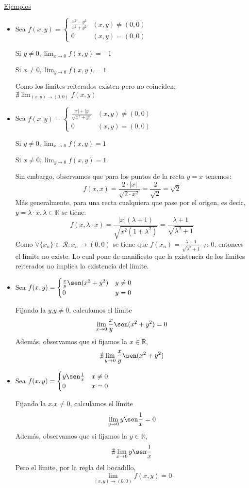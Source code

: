 \documentclass[10pt,a4paper,openright]{book}
\theoremstyle{break}
\begin{document}
\underline{Ejemplos}
\begin{itemize}
\item Sea $f(x,y) = \begin{cases} \frac{x^2 - y^2}{x^2 + y^2} & (x,y) \neq (0,0) \\ 0 & (x,y) = (0,0)\end{cases}$

Si $y \neq 0, \lim_{x \to 0} f(x,y) = -1$

Si $x \neq 0, \lim_{y \to 0} f(x,y) = 1$

Como los límites reiterados existen pero no coinciden, $\nexists \lim_{(x,y) \to (0,0)} f(x,y)$

\item Sea $f(x,y) = \begin{cases} \frac{|x| + |y|}{\sqrt{x^2 + y^2}}  & (x,y) \neq (0,0) \\ 0 & (x,y) = (0,0)\end{cases}$

Si $y \neq 0, \lim_{x \to 0} f(x,y) = 1$

Si $x \neq 0, \lim_{y \to 0} f(x,y) = 1$

Sin embargo, observamos que para los puntos de la recta $y=x$ tenemos:
$$f(x,x) = \frac{2 \cdot |x|}{\sqrt{2 \cdot x^2}} = \frac{2}{\sqrt{2}} = \sqrt{2}$$
Más generalmente, para una recta cualquiera que pase por el origen, es decir, $y = \lambda \cdot x, \lambda \in \mathbb{R}$ se tiene:
$$f(x, \lambda \cdot x) = \frac{|x|(\lambda + 1)}{\sqrt{x^2 (1 + \lambda^2)}} = \frac{\lambda + 1}{\sqrt{\lambda^2 + 1 }}$$
Como $\forall\{x_n\}\subset \mathcal{R}: x_n \rightarrow (0,0)$ se tiene que $f(x_n)=\frac{\lambda + 1}{\sqrt{\lambda^2 + 1}} \nrightarrow 0$, entonces el límite no existe. Lo cual pone de manifiesto que la existencia de los límites reiterados no implica la existencia del límite.

\item Sea $f(x,y) = \begin{cases} \frac{x}{y} \sen (x^2 + y^2) & y \neq 0 \\ 0 & y = 0 \end{cases}$

Fijando la $y$,$y \neq 0$, calculamos el límite $$\lim_{x \to 0} \frac{x}{y} \sen (x^2 + y^2) = 0$$
Además, observamos que si fijamos la $x \in \mathbb{R}$, $$\nexists \lim_{y \to 0} \frac{x}{y} \sen (x^2 + y^2) $$

\item Sea $f(x,y) = \begin{cases} y \sen \frac{1}{x} & x \neq 0 \\ 0 & x = 0 \end{cases}$

Fijando la $x$,$x \neq 0$, calculamos el límite $$\lim_{y \to 0}  y \sen \frac{1}{x} = 0$$
Además, observamos que si fijamos la $y \in \mathbb{R}$, $$\nexists \lim_{x \to 0}  y \sen \frac{1}{x} $$
Pero el límite, por la regla del bocadillo, $$\lim_{(x,y) \to (0,0)} f(x,y) = 0$$ 

\end{itemize}
\end{document}
